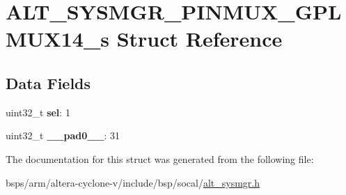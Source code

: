 \hypertarget{structALT__SYSMGR__PINMUX__GPLMUX14__s}{}\section{A\+L\+T\+\_\+\+S\+Y\+S\+M\+G\+R\+\_\+\+P\+I\+N\+M\+U\+X\+\_\+\+G\+P\+L\+M\+U\+X14\+\_\+s Struct Reference}
\label{structALT__SYSMGR__PINMUX__GPLMUX14__s}
\subsection*{Data Fields}
\begin{DoxyCompactItemize}
\item 
\mbox{\label{structALT__SYSMGR__PINMUX__GPLMUX14__s_acae7f8d1070c1e9d0b9551ce2f273dc4}} 
uint32\+\_\+t {\bfseries sel}\+: 1
\item 
\mbox{\label{structALT__SYSMGR__PINMUX__GPLMUX14__s_a538463e229964dfed4d520f1517e6137}} 
uint32\+\_\+t {\bfseries \+\_\+\+\_\+pad0\+\_\+\+\_\+}\+: 31
\end{DoxyCompactItemize}


The documentation for this struct was generated from the following file\+:\begin{DoxyCompactItemize}
\item 
bsps/arm/altera-\/cyclone-\/v/include/bsp/socal/\mbox{\hyperlink{alt__sysmgr_8h}{alt\+\_\+sysmgr.\+h}}\end{DoxyCompactItemize}
